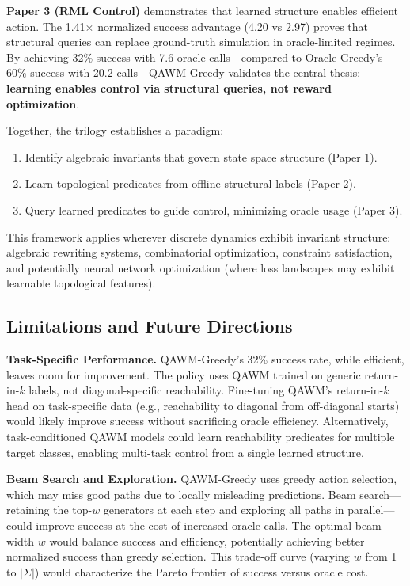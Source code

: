 \textbf{Paper 3 (RML Control)} demonstrates that learned structure enables efficient action. The 1.41$\times$ normalized success advantage (4.20 vs 2.97) proves that structural queries can replace ground-truth simulation in oracle-limited regimes. By achieving 32\% success with 7.6 oracle calls—compared to Oracle-Greedy's 60\% success with 20.2 calls—QAWM-Greedy validates the central thesis: \textbf{learning enables control via structural queries, not reward optimization}.

Together, the trilogy establishes a paradigm:
\begin{enumerate}
\item Identify algebraic invariants that govern state space structure (Paper 1).
\item Learn topological predicates from offline structural labels (Paper 2).
\item Query learned predicates to guide control, minimizing oracle usage (Paper 3).
\end{enumerate}

This framework applies wherever discrete dynamics exhibit invariant structure: algebraic rewriting systems, combinatorial optimization, constraint satisfaction, and potentially neural network optimization (where loss landscapes may exhibit learnable topological features).

\subsection{Limitations and Future Directions}

\textbf{Task-Specific Performance.} QAWM-Greedy's 32\% success rate, while efficient, leaves room for improvement. The policy uses QAWM trained on generic return-in-$k$ labels, not diagonal-specific reachability. Fine-tuning QAWM's return-in-$k$ head on task-specific data (e.g., reachability to diagonal from off-diagonal starts) would likely improve success without sacrificing oracle efficiency. Alternatively, task-conditioned QAWM models could learn reachability predicates for multiple target classes, enabling multi-task control from a single learned structure.

\textbf{Beam Search and Exploration.} QAWM-Greedy uses greedy action selection, which may miss good paths due to locally misleading predictions. Beam search—retaining the top-$w$ generators at each step and exploring all paths in parallel—could improve success at the cost of increased oracle calls. The optimal beam width $w$ would balance success and efficiency, potentially achieving better normalized success than greedy selection. This trade-off curve (varying $w$ from 1 to $|\Sigma|$) would characterize the Pareto frontier of success versus oracle cost.

